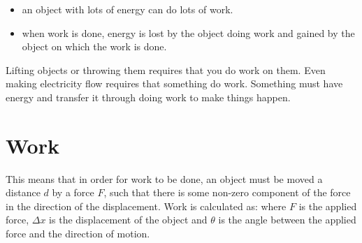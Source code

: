 \begin{itemize}
\item{an object with lots of energy can do lots of work.}
\item{when work is done, energy is lost by the object doing work and gained by the object on which the work is done.}
\end{itemize}

Lifting objects or throwing them requires that you do work on them. Even making electricity flow requires that something do work. Something must have energy and transfer it through doing work to make things happen.

\section{Work}


This means that in order for work to be done, an object must be moved a distance $d$ by a force $F$, such that there is some non-zero component of the force in the direction of the displacement. Work is calculated as:
where $F$ is the applied force, $\Delta x$ is the displacement of the object and $\theta$ is the angle between the applied force and the direction of motion.

